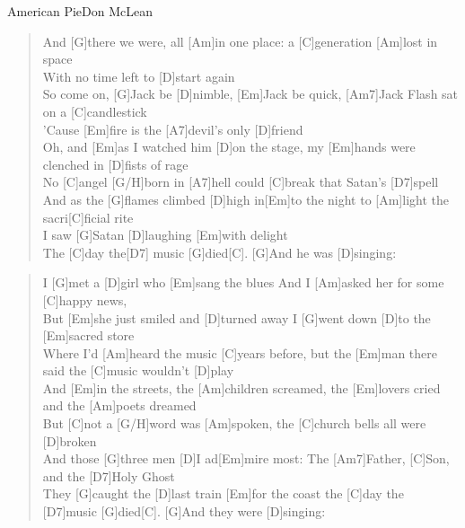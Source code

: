 \begin{song}{American Pie}{Don McLean}

    \begin{verse}
        And [G]there we were, all [Am]in one place: a [C]generation [Am]lost in space \\
        [Em]With no time left to [D]start again \\
        So come on, [G]Jack be [D]nimble, [Em]Jack be quick, [Am7]Jack Flash sat on a [C]candlestick \\ 
        'Cause [Em]fire is the [A7]devil's only [D]friend \\

        Oh, and [Em]as I watched him [D]on the stage, my [Em]hands were clenched in [D]fists of rage \\
        No [C]angel [G/H]born in [A7]hell could [C]break that Satan's [D7]spell \\
        And as the [G]flames climbed [D]high in[Em]to the night to [Am]light the sacri[C]ficial rite \\
        I saw [G]Satan [D]laughing [Em]with delight \\
        The [C]day the[D7] music [G]died[C]. \hspace{1em} [G]And he was [D]singing:
    \end{verse}


    \begin{verse}
        I [G]met a [D]girl who [Em]sang the blues
        And I [Am]asked her for some [C]happy news, \\
        But [Em]she just smiled and [D]turned away I [G]went down [D]to the [Em]sacred store \\
        Where I'd [Am]heard the music [C]years before, but the [Em]man there said the [C]music wouldn't [D]play \\
        And [Em]in the streets, the [Am]children screamed, the [Em]lovers cried and the [Am]poets dreamed \\
        But [C]not a [G/H]word was [Am]spoken, the [C]church bells all were [D]broken \\
        And those [G]three men [D]I ad[Em]mire most: The [Am7]Father, [C]Son, and the [D7]Holy Ghost \\
        They [G]caught the [D]last train [Em]for the coast the [C]day the [D7]music [G]died[C]. \hspace{1em} [G]And they were [D]singing:
    \end{verse}


\end{song}
